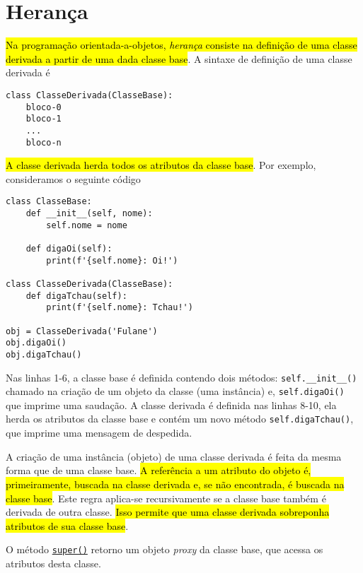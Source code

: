   

\section{Herança}\label{cap_oo_sec_her}

\hl{Na programação orientada-a-objetos, \emph{herança} consiste na definição de uma classe derivada a partir de uma dada classe base}. A sintaxe de definição de uma classe derivada é

\begin{lstlisting}
class ClasseDerivada(ClasseBase):
    bloco-0
    bloco-1
    ...
    bloco-n
\end{lstlisting}

\hl{A classe derivada herda todos os atributos da classe base}. Por exemplo, consideramos o seguinte código

\begin{lstlisting}
class ClasseBase:
    def __init__(self, nome):
        self.nome = nome
        
    def digaOi(self):
        print(f'{self.nome}: Oi!')

class ClasseDerivada(ClasseBase):
    def digaTchau(self):
        print(f'{self.nome}: Tchau!')

obj = ClasseDerivada('Fulane')
obj.digaOi()
obj.digaTchau()
\end{lstlisting}

Nas linhas 1-6, a classe base é definida contendo dois métodos: \lstinline+self.__init__()+ chamado na criação de um objeto da classe (uma instância) e, \lstinline+self.digaOi()+ que imprime uma saudação. A classe derivada é definida nas linhas 8-10, ela herda os atributos da classe base e contém um novo método \lstinline+self.digaTchau()+, que imprime uma mensagem de despedida.

A criação de uma instância (objeto) de uma classe derivada é feita da mesma forma que de uma classe base. \hl{A referência a um atributo do objeto é, primeiramente, buscada na classe derivada e, se não encontrada, é buscada na classe base}. Este regra aplica-se recursivamente se a classe base também é derivada de outra classe. \hl{Isso permite que uma classe derivada sobreponha atributos de sua classe base}.

\begin{obs}
O método \href{https://docs.python.org/3/library/functions.html#super}{\lstinline+super()+} retorno um objeto \textit{proxy} da classe base, que acessa os atributos desta classe.
\end{obs}


